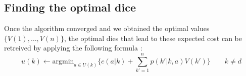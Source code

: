 
\subsection{Finding the optimal dice} %
\label{sub:choosing_the_optimal_dice}
Once the algorithm converged and we obtained the optimal 
values $\{V(1), \dots, V(n)\}$, the optimal dies that
lead to these expected cost can be retreived by applying
the following formula :
\[
  u(k) \leftarrow \text{argmin}_{a\in U(k)} \{c(a|k) 
  + \sum_{k'=1}^n p(k'|k,a)V(k') \} \qquad k \neq d
\]


